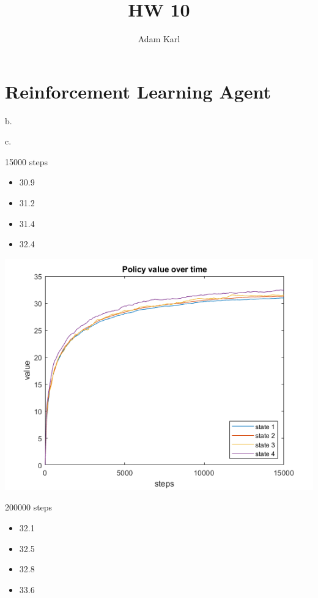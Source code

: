 \documentclass{article}
\title{HW 10}
\author{Adam Karl}
\begin{document}
\maketitle

\section{Reinforcement Learning Agent}

b.

\noindent 
c.

15000 steps
\begin{itemize}
    \item 30.9
    \item 31.2
    \item 31.4
    \item 32.4
\end{itemize}

\begin{center}
    \includegraphics[scale=1]{1c.png}
\end{center}


200000 steps
\begin{itemize}
    \item 32.1
    \item 32.5
    \item 32.8
    \item 33.6
\end{itemize}
\end{document}
